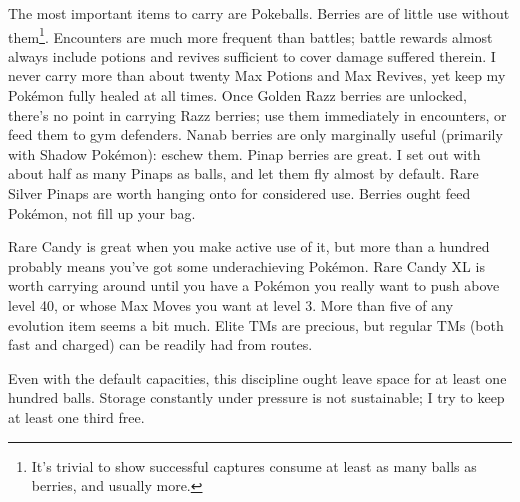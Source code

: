 The most important items to carry are Pokeballs.
Berries are of little use without them\footnote{It's trivial to show successful
 captures consume at least as many balls as berries, and usually more.}.
Encounters are much more frequent than battles; battle rewards almost always
 include potions and revives sufficient to cover damage suffered therein.
I never carry more than about twenty Max Potions and Max Revives, yet keep my Pokémon fully healed at all times.
Once Golden Razz berries are unlocked, there's no point in carrying Razz berries;
  use them immediately in encounters, or feed them to gym defenders.
Nanab berries are only marginally useful (primarily with Shadow Pokémon): eschew them.
Pinap berries are great.
I set out with about half as many Pinaps as balls, and let them fly almost by default.
Rare Silver Pinaps are worth hanging onto for considered use.
Berries ought feed Pokémon, not fill up your bag.

Rare Candy is great when you make active use of it, but more than a hundred
  probably means you've got some underachieving Pokémon.
Rare Candy XL is worth carrying around until you have a Pokémon you really
  want to push above level 40, or whose Max Moves you want at level 3.
More than five of any evolution item seems a bit much.
Elite TMs are precious, but regular TMs (both fast and charged) can be readily
  had from routes.

Even with the default capacities, this discipline ought leave space for at least one hundred balls.
Storage constantly under pressure is not sustainable; I try to keep at least one third free.


